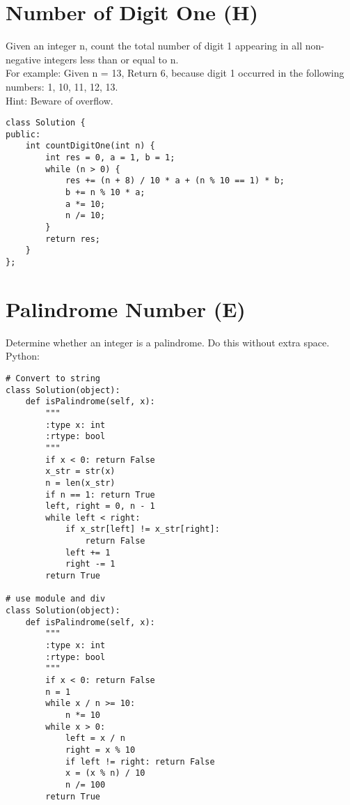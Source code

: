 \section{Number of Digit One (H)}
Given an integer n, count the total number of digit 1 appearing in all non-negative integers less than or equal to n.\\

For example:
Given n = 13,
Return 6, because digit 1 occurred in the following numbers: 1, 10, 11, 12, 13.\\

Hint: Beware of overflow.\\

\begin{lstlisting}
class Solution {
public:
    int countDigitOne(int n) {
        int res = 0, a = 1, b = 1;
        while (n > 0) {
            res += (n + 8) / 10 * a + (n % 10 == 1) * b;
            b += n % 10 * a;
            a *= 10;
            n /= 10;
        }
        return res;
    }
};
\end{lstlisting}


\section{Palindrome Number (E)}
Determine whether an integer is a palindrome. Do this without extra space. \\

Python:
\lstset{language=python}

\begin{lstlisting}
# Convert to string
class Solution(object):
    def isPalindrome(self, x):
        """
        :type x: int
        :rtype: bool
        """
        if x < 0: return False
        x_str = str(x)
        n = len(x_str)
        if n == 1: return True
        left, right = 0, n - 1
        while left < right:
            if x_str[left] != x_str[right]:
                return False
            left += 1
            right -= 1
        return True
    
# use module and div
class Solution(object):
    def isPalindrome(self, x):
        """
        :type x: int
        :rtype: bool
        """
        if x < 0: return False
        n = 1
        while x / n >= 10:
            n *= 10
        while x > 0:
            left = x / n
            right = x % 10
            if left != right: return False
            x = (x % n) / 10
            n /= 100
        return True
\end{lstlisting}

